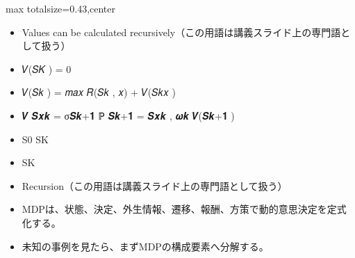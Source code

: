 \clearpage
{}
\begin{minipage}[t]{0.405\textwidth}
\begin{adjustbox}{max totalsize={\textwidth}{0.43\textheight},center}
\begin{minipage}{\textwidth}\scriptsize
{}\begin{itemize}
\item Values can be calculated recursively（この用語は講義スライド上の専門語として扱う）
\item 𝑉(𝑆𝐾 ) = 0
\item 𝑉(𝑆𝑘 ) = 𝑚𝑎𝑥 𝑅(𝑆𝑘 , 𝑥) + 𝑉(𝑆𝑘𝑥 )
\item 𝑽 𝑺𝒙𝒌 = σ𝑺𝒌+𝟏 ℙ 𝑺𝒌+𝟏 = 𝑺𝒙𝒌 , 𝝎𝒌 𝑽(𝑺𝒌+𝟏 )
\item S0 SK
\item SK
\item Recursion（この用語は講義スライド上の専門語として扱う）
\end{itemize}\begin{itemize}
\item MDPは、状態、決定、外生情報、遷移、報酬、方策で動的意思決定を定式化する。
\item 未知の事例を見たら、まずMDPの構成要素へ分解する。
\end{itemize}
\end{minipage}
\end{adjustbox}
\end{minipage}\hfill
